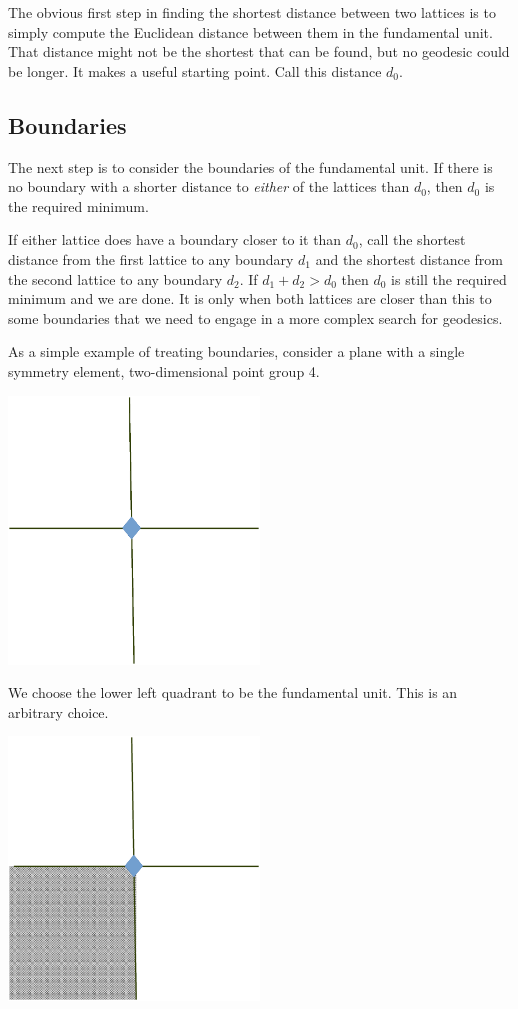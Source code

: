 \documentclass[preprint]{iucr}              %
\numberwithin{equation}{section}
\begin{document}
	The obvious first step in finding the shortest distance between two
	lattices is to simply compute the Euclidean distance between
	them in the fundamental unit. That distance might not be the
	shortest that can be found, but no geodesic could 
	be longer. It makes a useful starting point. Call 
	this distance $d_0$.
	
	\subsection{Boundaries}
	
	The next step is to consider the boundaries of the fundamental
	unit. If there is no boundary with a shorter distance to
	 \textit{either} of	the lattices than $d_0$, then $d_0$ is the required minimum.  
	 
	If either lattice does have a boundary closer to it than
	$d_0$, call the shortest distance from the first lattice
	to any boundary $d_1$ and the shortest distance
	from the second lattice to any boundary $d_2$.  If 
	$d_1 +d_2 > d_0$ then $d_0$ is still the required
	minimum and we are done.   It is only when both lattices
	are closer than this to some boundaries that we need to
	engage in a more complex search for geodesics. 
	
	As a simple example of treating boundaries, consider a plane with a single
	symmetry element, two-dimensional point group 4.
	
	\includegraphics[width = 0.5\textwidth ]{4_1}
	
	We choose the lower left quadrant to be the fundamental unit.
    This is an arbitrary choice.
	
	\includegraphics[width = 0.5\textwidth ]{4_1_1}
	
\end{document}
